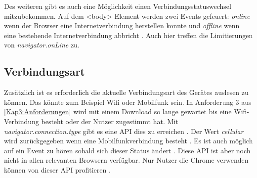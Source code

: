 Des weiteren gibt es auch eine Möglichkeit einen Verbindungsstatuswechsel mitzubekommen. Auf dem <body> Element werden zwei Events gefeuert: \emph{online} wenn der Browser eine Internetverbindung herstellen konnte und \emph{offline} wenn eine bestehende Internetverbindung abbricht \autocite{mdn-online}. Auch hier treffen die Limitierungen von \emph{navigator.onLine} zu.

\subsection{Verbindungsart}
Zusätzlich ist es erforderlich die aktuelle Verbindungsart des Gerätes auslesen zu können. Das könnte zum Beispiel Wifi oder Mobilfunk sein. In Anforderung 3 aus \autoref{Kap3:Anforderungen} wird mit einem Download so lange gewartet bis eine Wifi-Verbindung besteht oder der Nutzer zugestimmt hat. Mit \emph{navigator.connection.type} gibt es eine \ac{API} dies zu erreichen \autocite{network-type-mdn}. Der Wert \textit{cellular} wird zurückgegeben wenn eine Mobilfunkverbindung besteht \autocite{network-type-mdn}. Es ist auch möglich auf ein Event zu hören sobald sich dieser Status ändert \autocite{network-information-mdn}. Diese \ac{API} ist aber noch nicht in allen relevanten Browsern verfügbar. Nur Nutzer die Chrome verwenden können von dieser \ac{API} profitieren \autocite{network-type-mdn}.
